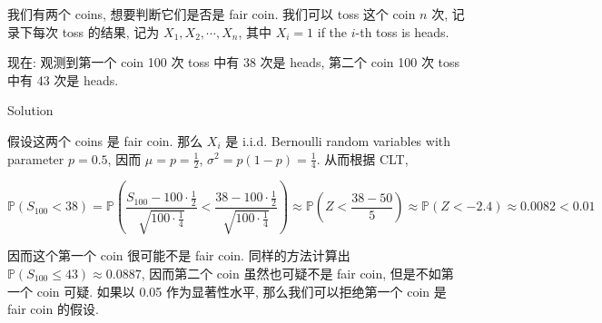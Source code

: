 \documentclass{qlnotes-export}
\begin{document}
\begin{example}\label{ex-05-clt-coin-fair}

我们有两个 coins, 想要判断它们是否是 fair coin. 我们可以 toss 这个 coin \(n\) 次, 记录下每次 toss 的结果, 记为 \(X_{1},X_{2},\cdots,X_{n}\), 其中 \(X_{i} = 1\) if the \(i\)-th toss is heads.

现在: 观测到第一个 coin 100 次 toss 中有 38 次是 heads, 第二个 coin 100 次 toss 中有 43 次是 heads.

\begin{qlsolution}{Solution}

假设这两个 coins 是 fair coin. 那么 \(X_{i}\) 是 i.i.d. Bernoulli random variables with parameter \(p = 0.5\), 因而 \(\mu = p = \frac{1}{2}\), \(\sigma^{2} = p(1 - p) = \frac{1}{4}\). 从而根据 CLT,

\[{\mathbb{P}}(S_{100} < 38) = {\mathbb{P}}\left( {\frac{S_{100} - 100 \cdot \frac{1}{2}}{\sqrt{100 \cdot \frac{1}{4}}} < \frac{38 - 100 \cdot \frac{1}{2}}{\sqrt{100 \cdot \frac{1}{4}}}} \right) \approx {\mathbb{P}}\left( {Z < \frac{38 - 50}{5}} \right) \approx {\mathbb{P}}(Z < - 2.4) \approx 0.0082 < 0.01\]

因而这个第一个 coin 很可能不是 fair coin. 同样的方法计算出 \({\mathbb{P}}\left( {S_{100} \leq 43} \right) \approx 0.0887\), 因而第二个 coin 虽然也可疑不是 fair coin, 但是不如第一个 coin 可疑. 如果以 0.05 作为显著性水平, 那么我们可以拒绝第一个 coin 是 fair coin 的假设.\\

\end{qlsolution}

\end{example}
\end{document}
